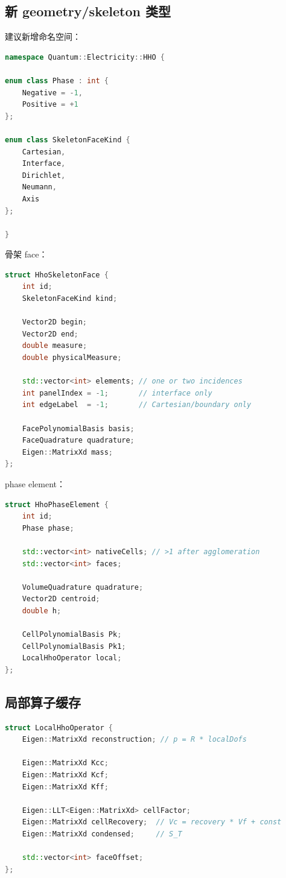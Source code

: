 \documentclass[UTF8,a4paper,11pt]{ctexart}
\begin{document}
\subsection{新 geometry/skeleton 类型}

建议新增命名空间：
\begin{lstlisting}[language=C++]
namespace Quantum::Electricity::HHO {

enum class Phase : int {
    Negative = -1,
    Positive = +1
};

enum class SkeletonFaceKind {
    Cartesian,
    Interface,
    Dirichlet,
    Neumann,
    Axis
};

}
\end{lstlisting}

骨架 face：
\begin{lstlisting}[language=C++]
struct HhoSkeletonFace {
    int id;
    SkeletonFaceKind kind;

    Vector2D begin;
    Vector2D end;
    double measure;
    double physicalMeasure;

    std::vector<int> elements; // one or two incidences
    int panelIndex = -1;       // interface only
    int edgeLabel  = -1;       // Cartesian/boundary only

    FacePolynomialBasis basis;
    FaceQuadrature quadrature;
    Eigen::MatrixXd mass;
};
\end{lstlisting}

phase element：
\begin{lstlisting}[language=C++]
struct HhoPhaseElement {
    int id;
    Phase phase;

    std::vector<int> nativeCells; // >1 after agglomeration
    std::vector<int> faces;

    VolumeQuadrature quadrature;
    Vector2D centroid;
    double h;

    CellPolynomialBasis Pk;
    CellPolynomialBasis Pk1;
    LocalHhoOperator local;
};
\end{lstlisting}

\subsection{局部算子缓存}

\begin{lstlisting}[language=C++]
struct LocalHhoOperator {
    Eigen::MatrixXd reconstruction; // p = R * localDofs

    Eigen::MatrixXd Kcc;
    Eigen::MatrixXd Kcf;
    Eigen::MatrixXd Kff;

    Eigen::LLT<Eigen::MatrixXd> cellFactor;
    Eigen::MatrixXd cellRecovery;  // Vc = recovery * Vf + const
    Eigen::MatrixXd condensed;     // S_T

    std::vector<int> faceOffset;
};
\end{lstlisting}
\end{document}
